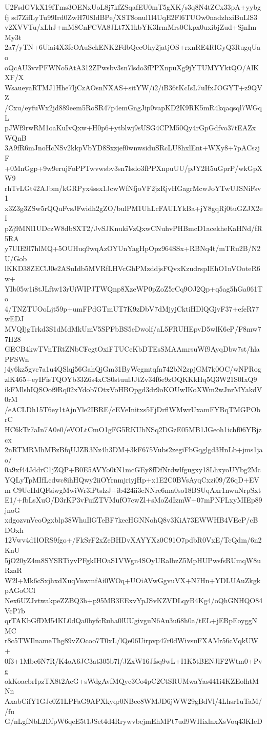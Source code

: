 U2FsdGVkX19fTms3OENxUoL8j7kfZSqafEU0mT5gXK/s3q8N4tZCx33pA+yybgfj
sd7ZifLyTu99Ird0ZwH708IdBPe/XST8onul1l4UqE2Fl6TUOw0nadzhxiBuLlS3
v2XVVTu/xLhJ+mM8CnFCVA8JLt7X1kbYK3IrmMrs0Ckpx0uxibjZud+SjnImMy3t
2a7/yTN+6Uiai4X3fcOAuSckENK2FdbQecOhy2jatjOS+rxnRE4RlGyQ3RugqUao
oQcAU3vvPFWNo5AtA312ZPwsbv3sn7lsdo3fPPXnpuXg9jYTUMYYktQO/AlKXF/X
WsaueyaRTMJ1Hhe7IjCzAOsnNXAS+sitYW/i2/iB36tKcIsL7uIfxJOGYT+z9QVZ
/Cxu/eyfuWx2jd889eem5RoSR47p4emGngJip0vapKD2K9RK5mR4kqaqsql7WGqL
pJWf9rwRM1oaKuIvQxw+H0p6+ytblwj9sUSG4CPM50Qy4rGpGdfvo37tEAZxWQnB
3A9fR6mJnoHcNSv2kkpVbYD8Sxzjef0wnwsiduSRcLU8hxlEnt+WXy8+7pACszjF
+0MnGgp+9w9erujFoPPTwvwsbv3sn7lsdo3fPPXnpuUU/pJY2H5uGprP/wkGpXW9
rhTvLGt42AJbm/kGRPyx4ssx1JcwWfNfjoVF2jzRjvHGagrMcwJoYTwUJSNiFsv1
x3Z3g3ZSw5rQQuFvsJFwidh2gZO/bulPM1UhLcFAULYkBa+jY8gqRj0tuGZJX2eI
pZj9MNl1UDczW8db8XT2/JvSJKnukiVzQxwCNuhvPHBmcD1acekheKaHNd/fR5RA
y7UIE9I7hlMQ+5OUHuq9wqAzOYUnYagHpOpz964SSx+RBNq4t/mTRu2B/N2U/Gob
lKKD38ZEClJ0e2ASuIdb5MVRfLHVcGhPMzddjsFQvxKzudrspIEhO1nVOoteR6w+
YIb05w1i8tJLftw13rUiWIPJTWQnp8XzeWP0pZoZ5rCq9OJ2Qp+q5ag5hGa061To
4/TNZTUOoLjt59p+umFPdGTmUT7K9zDbV7dMjyjCktiHDlQGjvF37+efeR77wEDJ
MVQIjgTrkd3S1dMdMkUmV5SPFbBS5eDwolf/aL5FRUHEpvD5wlK6eP/F8mw77H28
GECB4kwTVnTRtZNbCFegtOxiFTUCeKbDTEsSMAAmrsuWf9AyqDbw7st/hlaPFSWn
j4y6kz5gvc7a1u4QSlqj56GahQjGm31ByWegmtqfn742bN2zpjGM7k0OC/wNPRog
zlK465+eyIFisTQOYb33Z6s4xCS0stuulJJtZv34f6e9zOQKKkHq5Q3W21S0IxQ9
ikFMlshIQSOof9Rq02xYdob7OtxVoHBOpgd3dr9oKOUwIKoXWm2wJnrMYakdV0rM
/eACLDh15T6ey1tAjnYle2IBRE/cEVeInitxs5FjDrflWMwrUxamFYBqTMGPObrC
HC6kTz7aIn7A0e0/eVOLtCmO1gFG5RKUbNSq2DGzE05MB1JGeoh1ichf06YBjzcx
2nRTMRMhMBzBfqUJZR3Nz4h3DM+3kF675Vubs2zegiFbGqglgd3HnLb+jms1jao/
0a9xf44JddrC1jZQP+B0E5AVYo0tN1mcGEy8fDfNrdwlfgugxy18LhxyoUYbg2Mc
YQLyTpMIfLcdwc8ihHQwy2iiOYrnmjriyjHp+x1E2C0BVsAyqCxzi09/Z6qD+EVm
C9UeHdQFsiwgMwiWr3iPtslzJ+ib424ii3eNNre6ma0so18BSUqAxr1nwuNrpSxt
E1/+fbLsXuO/D3rKP3vFuiZTVMufO7cwZl+sMoZdIzmW+07mPNFLxyMIEp89jnoG
xdgozvnVeoOgxblp38WhuIlGTeBF7kecHGNNohQ8v3KiA73EWWHB4VEcP/cBDOxh
12Vwv4d1lORS9fgo+/FkSrF2xZeBHDvXAYYXz0C91O7pdbR0VxE/TcQdm/6n2KnU
5jO20yZ4m8SYSRTiyvPFgkIHOaS1VWgn4SOyURalbzZ5MpHUPwsfsRUmqW8uRzaR
W2l+Mk6cSxjhxdXuqVnwmfAi0WOq+UOiAVwGgvuVX+N7Hn+YDLUAuZkgkpAGoCCl
Nex6UZJvtwakpeZZBQ3h+p95MB3EExvYpJSvKZVDLqyB4Kg4/oQhGNHQO84VcP7b
qrTAKbGfDM54KL0dQa0byfcRuha0lUUgivguN6Au3u68h0a/tEL+jEBpEoyggNMC
r8c5TWIlnameThg89vZOcoo7T0xL/lQe06Uirpvp47r0dWivsuFXAMr56cVqkUW+
0f3+1Mbc6N7R/K4oA6JC3at305b7l/JZxW16Jfsq9wL+I1K5tBENJlF2Wtm0+Pvg
okKoacbrIpzTX8t2AeG+sWdgAvfMQyc3Co4pC2CtSRUMwaYas441i4KZEolhtMNn
AxabCifY1GJe0Z1LPFaG9APXkyqr0NBee8WMJD6jWW29gBdVl/4Lhsr1uTaM//fu
G/nLgfNbL2DfpW6qeE5t1JSet4d4RrywvbcjmEhMPt7ud9WHixlnxXsVoq43KIeD
